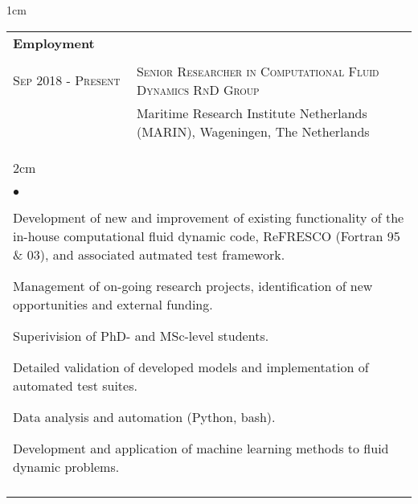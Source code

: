 \documentclass[a4paper,10pt]{article}
\newcommand{\squishlist}{
	\begin{list}{$\bullet$}
	{
		\setlength{\itemsep}{0pt}
		\setlength{\parsep}{0pt}
		\setlength{\topsep}{0pt}
		\setlength{\partopsep}{0pt}
		\setlength{\leftmargin}{2em}
		\setlength{\labelwidth}{1.5em}
		\setlength{\labelsep}{0.5em}
	}
}
\newcommand{\squishend}{\end{list}}
\begin{document}
\begin{minipage}{\textwidth}
\begin{adjustwidth}{}{1cm}

\begin{tabular}{p{3.5cm} p{12.9cm}}

\textbf{Employment} \\
\\

\textsc{Sep 2018 - Present} & \textsc{Senior Researcher in Computational Fluid Dynamics RnD Group} \\
							& Maritime Research Institute Netherlands (MARIN), Wageningen, The Netherlands \vspace{0.1cm} \\
%
\multicolumn{2}{l}{
\hspace{1cm}\begin{minipage}[t]{\textwidth}
\begin{adjustwidth}{}{2cm}
\squishlist
	\item Development of new and improvement of existing functionality of the in-house
		computational fluid dynamic code, ReFRESCO (Fortran 95 \& 03), and associated autmated test framework.
	\item Management of on-going research projects, identification of new opportunities and external funding.
	\item Superivision of PhD- and MSc-level students.
	\item Detailed validation of developed models and implementation of automated test suites.
	\item Data analysis and automation (Python, bash).
	\item Development and application of machine learning methods to fluid dynamic problems.
\squishend
\end{adjustwidth}
\end{minipage}
} \\
\\


\end{tabular}
\end{adjustwidth}
\end{minipage}
\end{document}
